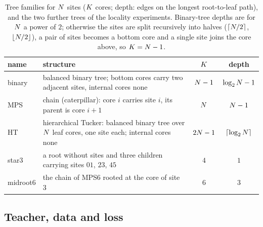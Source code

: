 \begin{table}[t]
  \centering
  \caption{Tree families for $N$ sites ($K$ cores; depth: edges on the longest root-to-leaf
    path), and the two further trees of the locality experiments. Binary-tree depths are for
    $N$ a power of $2$; otherwise the sites are split recursively into halves ($\lceil N/2\rceil$,
    $\lfloor N/2\rfloor$), a pair of sites becomes a bottom core and a single site joins the core
    above, so $K=N-1$.}
  \label{tab:trees}
  \begin{tabularx}{\textwidth}{@{}lXcc@{}}
    \toprule
    name & structure & $K$ & depth \\
    \midrule
    binary & balanced binary tree; bottom cores carry two adjacent sites, internal cores none
             & $N-1$ & $\log_2N-1$ \\
    MPS    & chain (caterpillar): core $i$ carries site $i$, its parent is core $i+1$
             & $N$ & $N-1$ \\
    HT     & hierarchical Tucker: balanced binary tree over $N$ leaf cores, one site each;
             internal cores none & $2N-1$ & $\lceil\log_2N\rceil$ \\
    star3  & a root without sites and three children carrying sites $01$, $23$, $45$ & $4$ & $1$ \\
    midroot6 & the chain of MPS6 rooted at the core of site $3$ & $6$ & $3$ \\
    \bottomrule
  \end{tabularx}
\end{table}



\subsection{Teacher, data and loss}\label{sec:setup-loss}

